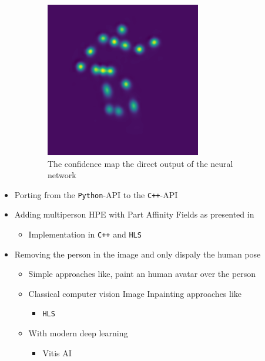 \documentclass[a4paper,12pt]{book}
\begin{document}
\begin{figure}[ht!]
\begin{subfigure}[t]{.45\textwidth}
    \includegraphics[width=1\linewidth]{images/board_conf.png}
    \caption{The confidence map the direct output of the neural network}
    \label{fig:conf}
  \end{subfigure}
  \caption{}
  \end{figure}
  \begin{itemize}
    \item Porting from the \texttt{Python}-API to the \texttt{C++}-API
      \item Adding multiperson HPE with Part Affinity Fields as presented in \cite{cao_simon_wei_sheikh_2017}
      \begin{itemize}
          \item  Implementation in \texttt{C++} and \texttt{HLS}
      \end{itemize}
      \item Removing the person in the image and only dispaly the human pose
      \begin{itemize}
        \item Simple approaches like, paint an human avatar over the person
          \item Classical computer vision Image Inpainting approaches like \cite{criminisi_perez_toyama_2004}
          \begin{itemize}
              \item \texttt{HLS}
          \end{itemize}
          \item With modern deep learning \cite{nazeri_ng_joseph_qureshi_ebrahimi_2019}
          \begin{itemize}
              \item Vitis AI
          \end{itemize}
      \end{itemize}
  \end{itemize}

  
  {}
  
\end{document}
